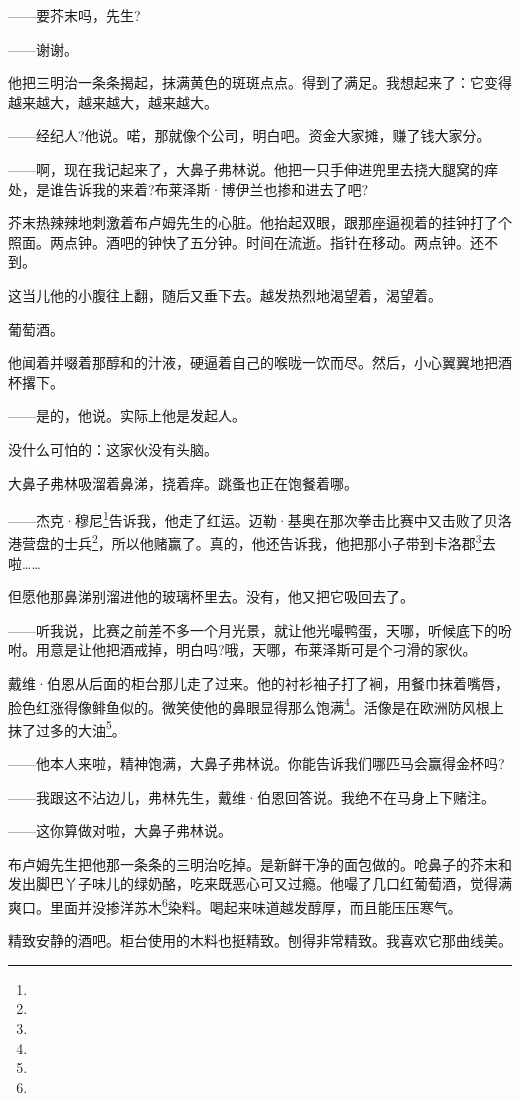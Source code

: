 \par ——要芥末吗，先生?
\par ——谢谢。
\par 他把三明治一条条揭起，抹满黄色的斑斑点点。得到了满足。我想起来了：它变得越来越大，越来越大，越来越大。
\par ——经纪人?他说。喏，那就像个公司，明白吧。资金大家摊，赚了钱大家分。
\par ——啊，现在我记起来了，大鼻子弗林说。他把一只手伸进兜里去挠大腿窝的痒处，是谁告诉我的来着?布莱泽斯·博伊兰也掺和进去了吧?
\par 芥末热辣辣地刺激着布卢姆先生的心脏。他抬起双眼，跟那座逼视着的挂钟打了个照面。两点钟。酒吧的钟快了五分钟。时间在流逝。指针在移动。两点钟。还不到。
\par 这当儿他的小腹往上翻，随后又垂下去。越发热烈地渴望着，渴望着。
\par 葡萄酒。
\par 他闻着并啜着那醇和的汁液，硬逼着自己的喉咙一饮而尽。然后，小心翼翼地把酒杯撂下。
\par ——是的，他说。实际上他是发起人。
\par 没什么可怕的：这家伙没有头脑。
\par 大鼻子弗林吸溜着鼻涕，挠着痒。跳蚤也正在饱餐着哪。
\par ——杰克·穆尼\footnote{}告诉我，他走了红运。迈勒·基奥在那次拳击比赛中又击败了贝洛港营盘的士兵\footnote{}，所以他赌赢了。真的，他还告诉我，他把那小子带到卡洛郡\footnote{}去啦……
\par 但愿他那鼻涕别溜进他的玻璃杯里去。没有，他又把它吸回去了。
\par ——听我说，比赛之前差不多一个月光景，就让他光嘬鸭蛋，天哪，听候底下的吩咐。用意是让他把酒戒掉，明白吗?哦，天哪，布莱泽斯可是个刁滑的家伙。
\par 戴维·伯恩从后面的柜台那儿走了过来。他的衬衫袖子打了裥，用餐巾抹着嘴唇，脸色红涨得像鲱鱼似的。微笑使他的鼻眼显得那么饱满\footnote{}。活像是在欧洲防风根上抹了过多的大油\footnote{}。
\par ——他本人来啦，精神饱满，大鼻子弗林说。你能告诉我们哪匹马会赢得金杯吗?
\par ——我跟这不沾边儿，弗林先生，戴维·伯恩回答说。我绝不在马身上下赌注。
\par ——这你算做对啦，大鼻子弗林说。
\par 布卢姆先生把他那一条条的三明治吃掉。是新鲜干净的面包做的。呛鼻子的芥末和发出脚巴丫子味儿的绿奶酪，吃来既恶心可又过瘾。他嘬了几口红葡萄酒，觉得满爽口。里面并没掺洋苏木\footnote{}染料。喝起来味道越发醇厚，而且能压压寒气。
\par 精致安静的酒吧。柜台使用的木料也挺精致。刨得非常精致。我喜欢它那曲线美。
